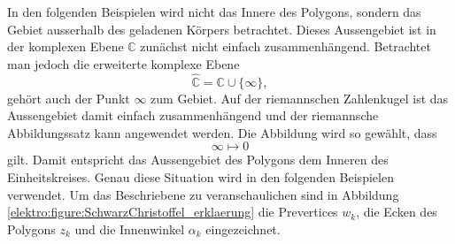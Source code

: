 
In den folgenden Beispielen wird nicht das Innere des Polygons, sondern das Gebiet ausserhalb des geladenen Körpers betrachtet.
Dieses Aussengebiet ist in der komplexen Ebene $\mathbb{C}$ zunächst nicht einfach zusammenhängend.
Betrachtet man jedoch die erweiterte komplexe Ebene
\begin{equation*}
    \widehat{\mathbb{C}} = \mathbb{C} \cup \{\infty\},
\end{equation*}
gehört auch der Punkt $\infty$ zum Gebiet.
Auf der riemannschen Zahlenkugel ist das Aussengebiet damit einfach zusammenhängend und der riemannsche Abbildungssatz kann angewendet werden.
Die Abbildung wird so gewählt, dass
\begin{equation*}
    \infty \longmapsto 0
\end{equation*}
gilt.
Damit entspricht das Aussengebiet des Polygons dem Inneren des Einheitskreises.
Genau diese Situation wird in den folgenden Beispielen verwendet.
Um das Beschriebene zu veranschaulichen sind in Abbildung \ref{elektro:figure:SchwarzChristoffel_erklaerung} die Prevertices $w_k$, die Ecken des Polygons $z_k$ und die Innenwinkel $\alpha_k$ eingezeichnet.



